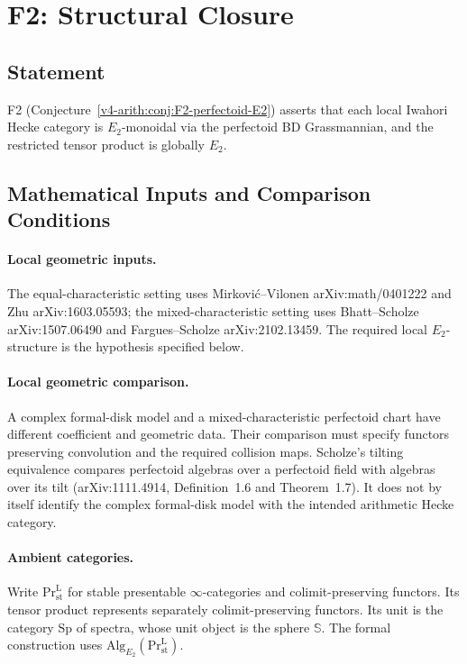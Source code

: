 \section{F2: Structural Closure}
\label{v4-arith:cl:F2-closure}

\subsection{Statement}

F2 (Conjecture~\ref{v4-arith:conj:F2-perfectoid-E2}) asserts that each local
Iwahori Hecke category is \(E_{2}\)-monoidal via the perfectoid BD
Grassmannian, and the restricted tensor product is globally
\(E_{2}\).

\subsection{Mathematical Inputs and Comparison Conditions}

\paragraph{Local geometric inputs.} The equal-characteristic setting
uses Mirkovi\'c--Vilonen arXiv:math/0401222 and Zhu
arXiv:1603.05593; the mixed-characteristic setting uses
Bhatt--Scholze arXiv:1507.06490 and Fargues--Scholze arXiv:2102.13459.
The required local \(E_2\)-structure is the hypothesis specified below.

\paragraph{Local geometric comparison.} A complex formal-disk
model and a mixed-characteristic perfectoid chart have different
coefficient and geometric data. Their comparison must specify
functors preserving convolution and the required collision maps.
Scholze's tilting equivalence compares perfectoid algebras over
a perfectoid field with algebras over its tilt
(arXiv:1111.4914, Definition~1.6 and Theorem~1.7).
It does not by itself identify the complex formal-disk model
with the intended arithmetic Hecke category.

\paragraph{Ambient categories.} Write
\(\mathrm{Pr}^{\mathrm L}_{\mathrm{st}}\) for stable presentable
\(\infty\)-categories and colimit-preserving functors.
Its tensor product represents separately colimit-preserving
functors. Its unit is the category \(\mathrm{Sp}\) of spectra,
whose unit object is the sphere \(\mathbb S\).
The formal construction uses
\(\mathrm{Alg}_{E_2}(\mathrm{Pr}^{\mathrm L}_{\mathrm{st}})\).

